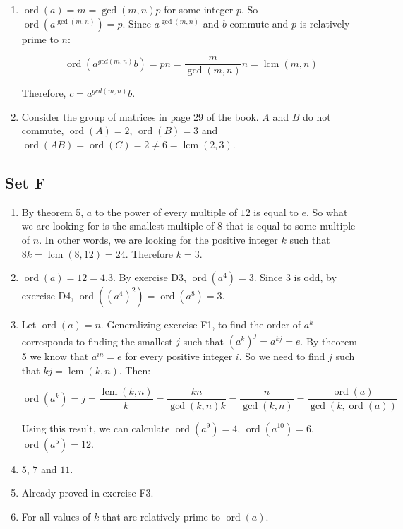 \documentclass{article}
\DeclareMathOperator{\ord}{ord}
\DeclareMathOperator{\lcm}{lcm}
\begin{document}
\begin{enumerate}
    \item $ \ord(a) = m = \gcd(m, n)p $ for some integer $ p $. So $ \ord(a^{\gcd(m, n)}) = p $. Since $ a^{\gcd(m, n)} $ and $ b $ commute and $ p $ is relatively prime to $ n $:

    $$ \ord(a^{gcd(m, n)}b) = pn = \frac{m}{\gcd(m, n)}n = \lcm(m, n) $$

    Therefore, $ c = a^{gcd(m, n)}b $.

    \item Consider the group of matrices in page 29 of the book. $ A $ and $ B $ do not commute, $ \ord(A) = 2 $, $ \ord(B) = 3 $ and $ \ord(AB) = \ord(C) = 2 \ne 6 = \lcm(2, 3) $.
\end{enumerate}

\subsection{Set F}
\begin{enumerate}
    \item By theorem 5, $ a $ to the power of every multiple of $ 12 $ is equal to $ e $. So what we are looking for is the smallest multiple of $ 8 $ that is equal to some multiple of $ n $. In other words, we are looking for the positive integer $ k $ such that $ 8k = \lcm(8, 12) = 24 $. Therefore $ k = 3 $.

    \item $ \ord(a) = 12 = 4.3 $. By exercise D3, $ \ord(a^4) = 3 $. Since $ 3 $ is odd, by exercise D4, $ \ord((a^4)^2) = \ord(a^8) = 3 $.

    \item Let $ \ord(a) = n $. Generalizing exercise F1, to find the order of $ a^k $ corresponds to finding the smallest $ j $ such that $ (a^k)^j = a^{kj} = e $. By theorem 5 we know that $ a^{in} = e$ for every positive integer $ i $. So we need to find $ j $ such that $ kj = \lcm(k, n) $. Then:

    $$ \ord(a^k) = j = \frac{\lcm(k, n)}{k} = \frac{kn}{\gcd(k, n)k} = \frac{n}{\gcd(k, n)} = \frac{\ord(a)}{\gcd(k, \ord(a))} $$

    Using this result, we can calculate $ \ord(a^9) = 4 $, $ \ord(a^{10}) = 6 $, $ \ord(a^5) = 12 $.

    \item $5$, $7$ and $11$.

    \item Already proved in exercise F3.

    \item For all values of $ k $ that are relatively prime to $ \ord(a) $.
\end{enumerate}
\end{document}
